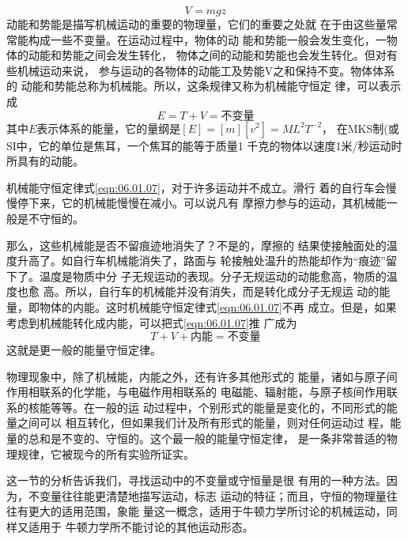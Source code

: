 \begin{equation*}
 V = m g z
\end{equation*}
动能和势能是描写机械运动的重要的物理量，它们的重要之处就
在于由这些量常常能构成一些不变量。在运动过程中，物体的动
能和势能一般会发生变化，一物体的动能和势能之间会发生转化，
物体之间的动能和势能也会发生转化。但对有些机械运动来说，
参与运动的各物体的动能工及势能V之和保持不变。物体体系的
动能和势能总称为机械能。所以，这条规律又称为机械能守恒定
律，可以表示成
\begin{equation}\label{eqn:06.01.07}
 E = T + V = \text{不变量}
\end{equation}
其中$ E $表示体系的能量，它的量纲是$ [ E ] = [ m ][ v ^ { 2 } ] = M L ^ { 2 } T ^ { - 2 } $，
在MKS制(或SI中，它的单位是焦耳，一个焦耳的能等于质量1
千克的物体以速度1米/秒运动时所具有的动能。

机械能守恒定律\lhbrak 式\eqref{eqn:06.01.07}\rhbrak ，对于许多运动并不成立。滑行
着的自行车会慢慢停下来，它的机械能慢慢在减小。可以说凡有
摩擦力参与的运动，其机械能一般是不守恒的。

那么，这些机械能是否不留痕迹地消失了？不是的，摩擦的
结果使接触面处的温度升高了。如自行车机械能消失了，路面与
轮接触处温升的热能却作为“痕迹”留下了。温度是物质中分
子无规运动的表现。分子无规运动的动能愈高，物质的温度也愈
高。所以，自行车的机械能并没有消失，而是转化成分子无规运
动的能量，即物体的内能。这时机械能守恒定律\lhbrak 式\eqref{eqn:06.01.07}\rhbrak 不再
成立。但是，如果考虑到机械能转化成内能，可以把式\eqref{eqn:06.01.07}推
广成为
\begin{equation*}
 T + V + \text{内能} = \text{不变量}
\end{equation*}
这就是更一般的能量守恒定律。

物理现象中，除了机械能，内能之外，还有许多其他形式的
能量，诸如与原子间作用相联系的化学能，与电磁作用相联系的
电磁能、辐射能，与原子核间作用联系的核能等等。在一般的运
动过程中，个别形式的能量是变化的，不同形式的能量之间可以
相互转化，但如果我们计及所有形式的能量，则对任何运动过
程，能量的总和是不变的、守恒的。这个最一般的能量守恒定律，
是一条非常普适的物理规律，它被现今的所有实验所证实。

这一节的分析告诉我们，寻找运动中的不变量或守恒量是很
有用的一种方法。因为，不变量往往能更清楚地描写运动，标志
运动的特征；而且，守恒的物理量往往有更大的适用范围，象能
量这一概念，适用于牛顿力学所讨论的机械运动，同样又适用于
牛顿力学所不能讨论的其他运动形态。